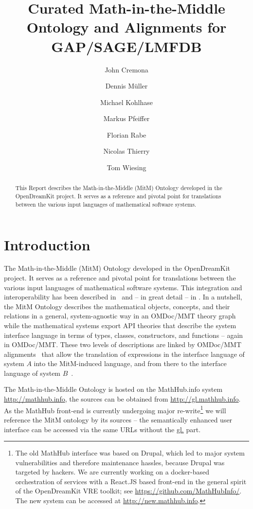 \documentclass[book]{deliverablereport}
\title{Curated Math-in-the-Middle Ontology and Alignments for GAP/SAGE/LMFDB}
\author{John Cremona}
\author{Dennis M\"uller}
\author{Michael Kohlhase}
\author{Markus Pfeiffer}
\author{Florian Rabe}
\author{Nicolas Thierry}
\author{Tom Wiesing}
\begin{document}
\begin{abstract}
  This Report describes the Math-in-the-Middle (MitM) Ontology developed in the
  OpenDreamKit project. It serves as a reference and pivotal point for translations
  between the various input languages of mathematical software systems. 
\end{abstract}
\maketitle
\newpage\tableofcontents\newpage

\section{Introduction}

The Math-in-the-Middle (MitM) Ontology developed in the OpenDreamKit project. It serves as
a reference and pivotal point for translations between the various input languages of
mathematical software systems. This integration and interoperability has been described
in~\cite{DehKohKon:iop16,WieKohRab:vtuimkb17,KohMuePfe:kbimss17} and -- in great detail --
in \cite{ODK-D6.5}. In a nutshell, the MitM Ontology describes the mathematical objects,
concepts, and their relations in a general, system-agnostic way in an OMDoc/MMT theory
graph while the mathematical systems export API theories that describe the system
interface language in terms of types, classes, constructors, and functions -- again in
OMDoc/MMT. These two levels of descriptions are linked by OMDoc/MMT
alignments~\cite{MueGauKal:cacfms17} that allow the translation of expressions in the
interface language of system $A$ into the MitM-induced language, and from there to the
interface language of system $B$~\cite{MueRoYuRa:abtafs17}.

The Math-in-the-Middle Ontology is hosted on the MathHub.info system
\url{http://mathhub.info}, the sources can be obtained from
\url{http://gl.mathhub.info}. As the MathHub front-end is currently undergoing major
re-write\footnote{The old MathHub interface was based on Drupal, which led to major system
  vulnerabilities and therefore maintenance hassles, because Drupal was targeted by
  hackers. We are currently working on a docker-based orchestration of services with a
  React.JS based front-end in the general spirit of the OpenDreamKit VRE toolkit; see
  \url{https://github.com/MathHubInfo/}. The new system can be accessed at
  \url{http://new.mathhub.info}.} we will reference the MitM ontology by its sources --
the semantically enhanced user interface can be accessed via the same URLs without the
\url{gl.} part.
\end{document}
